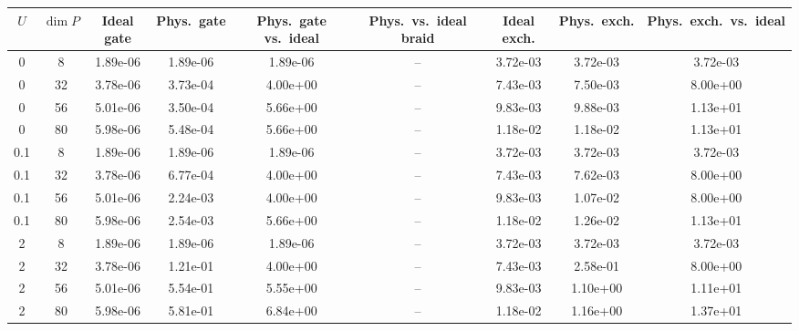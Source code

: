 \begin{tabular}{ccccccccc}
\hline
$U$ & $\dim P$ & Ideal gate & Phys.\ gate & Phys.\ gate vs.\ ideal & Phys.\ vs.\ ideal braid & Ideal exch. & Phys.\ exch. & Phys.\ exch.\ vs.\ ideal \\
\hline
0 & 8 & 1.89e-06 & 1.89e-06 & 1.89e-06 & -- & 3.72e-03 & 3.72e-03 & 3.72e-03 \\
0 & 32 & 3.78e-06 & 3.73e-04 & 4.00e+00 & -- & 7.43e-03 & 7.50e-03 & 8.00e+00 \\
0 & 56 & 5.01e-06 & 3.50e-04 & 5.66e+00 & -- & 9.83e-03 & 9.88e-03 & 1.13e+01 \\
0 & 80 & 5.98e-06 & 5.48e-04 & 5.66e+00 & -- & 1.18e-02 & 1.18e-02 & 1.13e+01 \\
\hline
0.1 & 8 & 1.89e-06 & 1.89e-06 & 1.89e-06 & -- & 3.72e-03 & 3.72e-03 & 3.72e-03 \\
0.1 & 32 & 3.78e-06 & 6.77e-04 & 4.00e+00 & -- & 7.43e-03 & 7.62e-03 & 8.00e+00 \\
0.1 & 56 & 5.01e-06 & 2.24e-03 & 4.00e+00 & -- & 9.83e-03 & 1.07e-02 & 8.00e+00 \\
0.1 & 80 & 5.98e-06 & 2.54e-03 & 5.66e+00 & -- & 1.18e-02 & 1.26e-02 & 1.13e+01 \\
\hline
2 & 8 & 1.89e-06 & 1.89e-06 & 1.89e-06 & -- & 3.72e-03 & 3.72e-03 & 3.72e-03 \\
2 & 32 & 3.78e-06 & 1.21e-01 & 4.00e+00 & -- & 7.43e-03 & 2.58e-01 & 8.00e+00 \\
2 & 56 & 5.01e-06 & 5.54e-01 & 5.55e+00 & -- & 9.83e-03 & 1.10e+00 & 1.11e+01 \\
2 & 80 & 5.98e-06 & 5.81e-01 & 6.84e+00 & -- & 1.18e-02 & 1.16e+00 & 1.37e+01 \\
\hline
\end{tabular}
